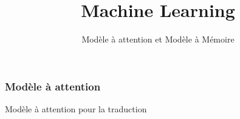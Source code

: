 \documentclass{formation}
\title{Machine Learning}
\subtitle{Modèle à attention et Modèle à Mémoire}
\begin{document}
\maketitle

\begin{frame}
  \frametitle{Modèle à attention}
  Modèle à attention pour la traduction
  \begin{center}
    \href{https://demo.allennlp.org/reading-comprehension}{}
  \end{center}
\end{frame}
\end{document}
